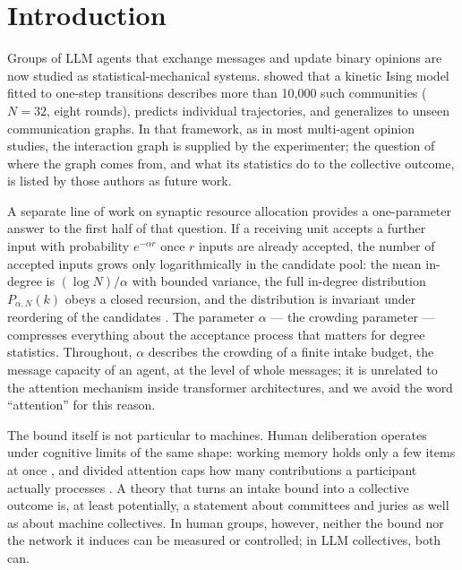 \documentclass[9pt,twocolumn]{extarticle}
\begin{document}
\section{Introduction}\label{sec:intro}

Groups of LLM agents that exchange messages and update binary opinions are now
studied as statistical-mechanical systems. \citet{El2026} showed that a kinetic
Ising model fitted to one-step transitions describes more than 10{,}000 such communities
($N = 32$, eight rounds), predicts individual trajectories, and generalizes to
unseen communication graphs. In that framework, as in most multi-agent opinion
studies, the interaction graph is supplied by the experimenter; the question of
where the graph comes from, and what its statistics do to the collective
outcome, is listed by those authors as future work.

A separate line of work on synaptic resource allocation provides a
one-parameter answer to the first half of that question. If a receiving unit
accepts a further input with probability $e^{-\alpha r}$ once $r$ inputs are
already accepted, the number of accepted inputs grows only logarithmically in
the candidate pool: the mean in-degree is $(\log N)/\alpha$ with bounded
variance, the full in-degree distribution $P_{\alpha,N}(k)$ obeys a closed
recursion, and the distribution is invariant under reordering of the
candidates \citep{SciRepCrowding}. The parameter $\alpha$ --- the crowding
parameter --- compresses everything about the acceptance process that matters
for degree statistics. Throughout, $\alpha$ describes the crowding of a finite intake budget, the message capacity of an agent, at the level of whole messages; it is unrelated to the attention
mechanism inside transformer architectures, and we avoid the word ``attention'' for this reason.

The bound itself is not particular to machines. Human deliberation operates under cognitive limits of the same shape: working memory holds only a few items at once \citep{Cowan2001}, and divided attention caps how many contributions a participant actually processes \citep{HodasLerman2012}. A theory that turns an intake bound into a collective outcome is, at least potentially, a statement about committees and juries as well as about machine collectives. In human groups, however, neither the bound nor the network it induces can be measured or controlled; in LLM collectives, both can.
\end{document}
